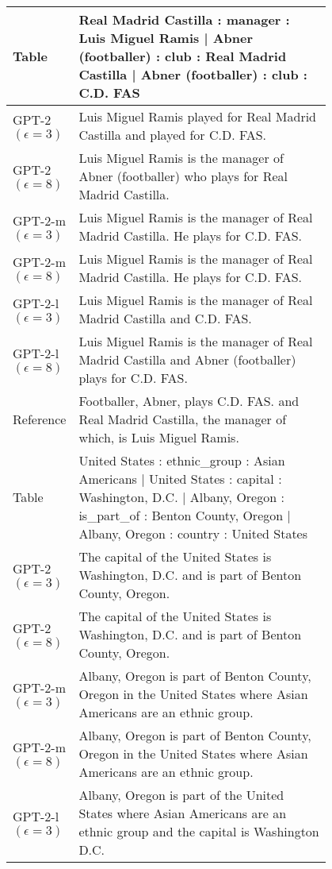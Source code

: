 \begin{table}[h]
\centering
\renewcommand{\arraystretch}{1.2}
\scriptsize
\begin{tabular}{l | p{0.8\linewidth}}
\toprule
Table & Real Madrid Castilla : manager : Luis Miguel Ramis | Abner (footballer) : club : Real Madrid Castilla | Abner (footballer) : club : C.D. FAS  \\
 \hline
GPT-2 $(\epsilon=3)$ & Luis Miguel Ramis played for Real Madrid Castilla and played for C.D. FAS. \\
GPT-2 $(\epsilon=8)$ & Luis Miguel Ramis is the manager of Abner (footballer) who plays for Real Madrid Castilla. \\
GPT-2-m $(\epsilon=3)$ & Luis Miguel Ramis is the manager of Real Madrid Castilla. He plays for C.D. FAS. \\
GPT-2-m $(\epsilon=8)$ & Luis Miguel Ramis is the manager of Real Madrid Castilla. He plays for C.D. FAS. \\
GPT-2-l $(\epsilon=3)$ & Luis Miguel Ramis is the manager of Real Madrid Castilla and C.D. FAS. \\
GPT-2-l $(\epsilon=8)$ & Luis Miguel Ramis is the manager of Real Madrid Castilla and Abner (footballer) plays for C.D. FAS. \\
\hline
 Reference & Footballer, Abner, plays C.D. FAS. and Real Madrid Castilla, the manager of which, is Luis Miguel Ramis. \\
\midrule\midrule
Table & United States : ethnic\_group : Asian Americans | United States : capital : Washington, D.C. | Albany, Oregon : is\_part\_of : Benton County, Oregon | Albany, Oregon : country : United States  \\
 \hline
GPT-2 $(\epsilon=3)$ & The capital of the United States is Washington, D.C. and is part of Benton County, Oregon. \\
GPT-2 $(\epsilon=8)$ & The capital of the United States is Washington, D.C. and is part of Benton County, Oregon. \\
GPT-2-m $(\epsilon=3)$ & Albany, Oregon is part of Benton County, Oregon in the United States where Asian Americans are an ethnic group. \\
GPT-2-m $(\epsilon=8)$ & Albany, Oregon is part of Benton County, Oregon in the United States where Asian Americans are an ethnic group. \\
GPT-2-l $(\epsilon=3)$ & Albany, Oregon is part of the United States where Asian Americans are an ethnic group and the capital is Washington D.C. \\

\end{tabular}
\end{table}

